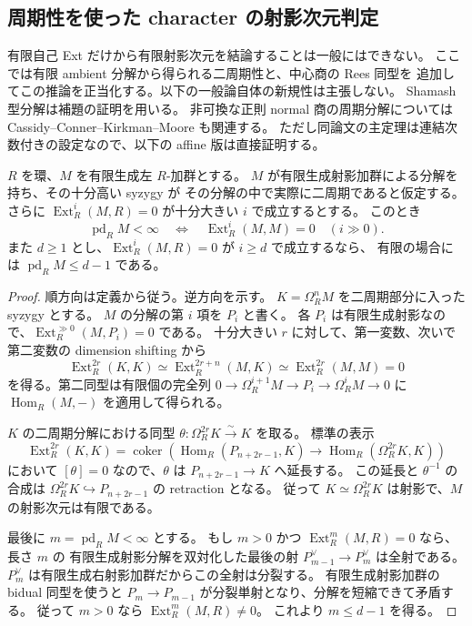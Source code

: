 \subsection{周期性を使った character の射影次元判定}

有限自己 Ext だけから有限射影次元を結論することは一般にはできない。
ここでは有限 ambient 分解から得られる二周期性と、中心商の Rees 同型を
追加してこの推論を正当化する。以下の一般論自体の新規性は主張しない。
Shamash 型分解は補題の証明を用いる。
非可換な正則 normal 商の周期分解については Cassidy--Conner--Kirkman--Moore
\cite[Theorem~4.2]{CMOPeriodicMF} も関連する。
ただし同論文の主定理は連結次数付きの設定なので、以下の affine 版は直接証明する。

\begin{lemma}[二周期性による有限射影次元の検出]
\label{cmo:lem:periodic-pd}
$R$ を環、$M$ を有限生成左 $R$-加群とする。
$M$ が有限生成射影加群による分解を持ち、その十分高い syzygy が
その分解の中で実際に二周期であると仮定する。
さらに $\operatorname{Ext}_R^i(M,R)=0$ が十分大きい $i$ で成立するとする。
このとき
\[
 \operatorname{pd}_R M<\infty
 \quad\Longleftrightarrow\quad
 \operatorname{Ext}_R^i(M,M)=0\quad(i\gg0).
\]
また $d\ge1$ とし、$\operatorname{Ext}_R^i(M,R)=0$ が $i\ge d$ で成立するなら、
有限の場合には $\operatorname{pd}_R M\le d-1$ である。
\end{lemma}
\begin{proof}
順方向は定義から従う。逆方向を示す。
$K=\Omega_R^n M$ を二周期部分に入った syzygy とする。
$M$ の分解の第 $i$ 項を $P_i$ と書く。
各 $P_i$ は有限生成射影なので、$\operatorname{Ext}_R^{\gg0}(M,P_i)=0$ である。
十分大きい $r$ に対して、第一変数、次いで第二変数の dimension shifting から
\[
 \operatorname{Ext}_R^{2r}(K,K)
 \simeq\operatorname{Ext}_R^{2r+n}(M,K)
 \simeq\operatorname{Ext}_R^{2r}(M,M)=0
\]
を得る。第二同型は有限個の完全列
$0\to\Omega_R^{i+1}M\to P_i\to\Omega_R^iM\to0$
に $\operatorname{Hom}_R(M,-)$ を適用して得られる。

$K$ の二周期分解における同型
$\theta:\Omega_R^{2r}K\xrightarrow{\sim}K$ を取る。
標準の表示
\[
 \operatorname{Ext}_R^{2r}(K,K)
 =\operatorname{coker}\!\left(
  \operatorname{Hom}_R(P_{n+2r-1},K)
  \longrightarrow\operatorname{Hom}_R(\Omega_R^{2r}K,K)\right)
\]
において $[\theta]=0$ なので、$\theta$ は $P_{n+2r-1}\to K$ へ延長する。
この延長と $\theta^{-1}$ の合成は
$\Omega_R^{2r}K\hookrightarrow P_{n+2r-1}$ の retraction となる。
従って $K\simeq\Omega_R^{2r}K$ は射影で、$M$ の射影次元は有限である。

最後に $m=\operatorname{pd}_R M<\infty$ とする。
もし $m>0$ かつ $\operatorname{Ext}_R^m(M,R)=0$ なら、長さ $m$ の
有限生成射影分解を双対化した最後の射
$P_{m-1}^{\vee}\to P_m^{\vee}$ は全射である。
$P_m^{\vee}$ は有限生成右射影加群だからこの全射は分裂する。
有限生成射影加群の bidual 同型を使うと
$P_m\to P_{m-1}$ が分裂単射となり、分解を短縮できて矛盾する。
従って $m>0$ なら $\operatorname{Ext}_R^m(M,R)\ne0$。
これより $m\le d-1$ を得る。
\end{proof}

